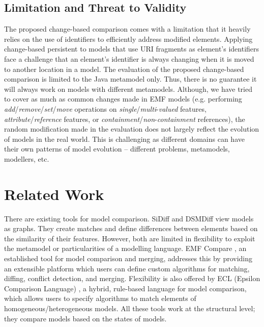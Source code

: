 \documentclass{jot}
\begin{document}
\subsection{Limitation and Threat to Validity}
\label{sec:limitation_and_Threat_to_validity}
The proposed change-based comparison comes with a limitation that it heavily relies on the use of identifiers to efficiently address modified elements. Applying change-based persistent to models that use URI fragments as element's identifiers face a challenge that an element's identifier is always changing when it is moved to another location in a model. The evaluation of the proposed change-based comparison is limited to the Java metamodel only. Thus, there is no guarantee it will always work on models with different metamodels. Although, we have tried to cover as much as common changes made in EMF models (e.g. performing \textit{add}/\textit{remove}/\textit{set}/\textit{move} operations on \textit{single}/\textit{multi}-\textit{valued} features, \textit{attribute}/\textit{reference} features, or \textit{containment}/\textit{non}-\textit{containment} references), the random modification made in the evaluation does not largely reflect the evolution of models in the real world. This is challenging as different domains can have their own patterns of model evolution -- different problems, metamodels, modellers, etc.

\section{Related Work}
\label{sec:related_work}
There are existing tools for model comparison. SiDiff \cite{Treude2007SiDiff} and DSMDiff \cite{lin2009dsmdiff} view models as graphs. They create matches and define differences between elements based on the similarity of their features. However, both are limited in flexibility to exploit the metamodel or particularities of a modelling language. EMF Compare \cite{emfcompare2018developer}, an established tool for model comparison and merging, addresses this by providing an extensible platform which users can define custom algorithms for matching, diffing, conflict detection, and merging. Flexibility is also offered by ECL (Epsilon Comparison Language) \cite{kolovos2009ecl}, a hybrid, rule-based language for model comparison, which allows users to specify algorithms to match elements of homogeneous/heterogeneous models. All these tools work at the structural level; they compare models based on the states of models.
\end{document}
